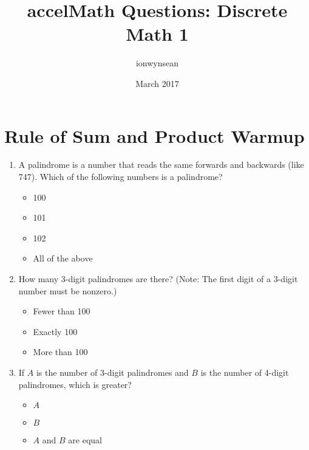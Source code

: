\documentclass{article}
\title{accelMath Questions: Discrete Math 1}
\author{ionwynsean }
\date{March 2017}
\begin{document}
\maketitle

\section{Rule of Sum and Product Warmup}

\begin{enumerate}
    \item A palindrome is a number that reads the same forwards and backwards (like 747). Which of the following numbers is a palindrome?

    
        \begin{itemize}
            \item 100
            \item 101
            \item 102
            \item All of the above
        \end{itemize}
        
    \item How many 3-digit palindromes are there? (Note: The first digit of a 3-digit number must be nonzero.)
    
    \begin{itemize}
        \item Fewer than 100
        \item Exactly 100
        \item More than 100
    \end{itemize}
    
    \item If $A$ is the number of 3-digit palindromes and $B$ is the number of 4-digit palindromes, which is greater?
    
    \begin{itemize}
        \item $A$
        \item $B$
        \item $A$ and $B$ are equal
    \end{itemize}
    

\end{enumerate}
\end{document}
